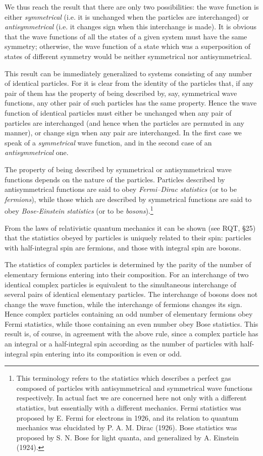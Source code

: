 We thus reach the result that there are only two possibilities: the wave function is either \textit{symmetrical} (i.e. it is unchanged when the particles are interchanged) or \textit{antisymmetrical} (i.e. it changes sign when this interchange is made). It is obvious that the wave functions of all the states of a given system must have the same symmetry; otherwise, the wave function of a state which was a superposition of states of different symmetry would be neither symmetrical nor antisymmetrical.

This result can be immediately generalized to systems consisting of any number of identical particles. For it is clear from the identity of the particles that, if any pair of them has the property of being described by, say, symmetrical wave functions, any other pair of such particles has the same property. Hence the wave function of identical particles must either be unchanged when any pair of particles are interchanged (and hence when the particles are permuted in any manner), or change sign when any pair are interchanged. In the first case we speak of a \textit{symmetrical} wave function, and in the second case of an \textit{antisymmetrical} one.

The property of being described by symmetrical or antisymmetrical wave functions depends on the nature of the particles. Particles described by antisymmetrical functions are said to obey \textit{Fermi–Dirac statistics} (or to be \textit{fermions}), while those which are described by symmetrical functions are said to obey \textit{Bose-Einstein statistics} (or to be \textit{bosons}).\footnote{This terminology refers to the statistics which describes a perfect gas composed of particles with antisymmetrical and symmetrical wave functions respectively. In actual fact we are concerned here not only with a different statistics, but essentially with a different mechanics. Fermi statistics was proposed by E. Fermi for electrons in 1926, and its relation to quantum mechanics was elucidated by P. A. M. Dirac (1926). Bose statistics was proposed by S. N. Bose for light quanta, and generalized by A. Einstein (1924).}

From the laws of relativistic quantum mechanics it can be shown (see RQT, \S25) that the statistics obeyed by particles is uniquely related to their spin: particles with half-integral spin are fermions, and those with integral spin are bosons.

The statistics of complex particles is determined by the parity of the number of elementary fermions entering into their composition. For an interchange of two identical complex particles is equivalent to the simultaneous interchange of several pairs of identical elementary particles. The interchange of bosons does not change the wave function, while the interchange of fermions changes its sign. Hence complex particles containing an odd number of elementary fermions obey Fermi statistics, while those containing an even number obey Bose statistics. This result is, of course, in agreement with the above rule, since a complex particle has an integral or a half-integral spin according as the number of particles with half-integral spin entering into its composition is even or odd.

